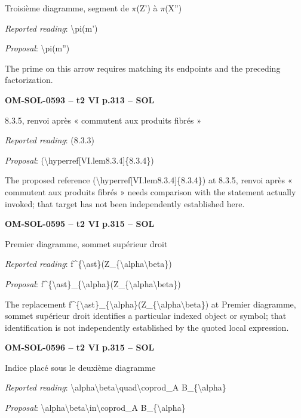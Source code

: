 Troisième diagramme, segment de \ensuremath{\pi}(Z') à \ensuremath{\pi}(X'')\par
\emph{Reported reading}: \textbackslash{}pi(m')\par
\emph{Proposal}: \textbackslash{}pi(m'')\par
The prime on this arrow requires matching its endpoints and the preceding factorization.\par
\par\noindent\textbf{OM-SOL-0593 -- t2 VI p.313 -- SOL}\par
8.3.5, renvoi après « commutent aux produits fibrés »\par
\emph{Reported reading}: (8.3.3)\par
\emph{Proposal}: (\textbackslash{}hyperref[VI.lem8.3.4]\{8.3.4\})\par
The proposed reference (\textbackslash{}hyperref[VI.lem8.3.4]\{8.3.4\}) at 8.3.5, renvoi après « commutent aux produits fibrés » needs comparison with the statement actually invoked; that target has not been independently established here.\par
\par\noindent\textbf{OM-SOL-0595 -- t2 VI p.315 -- SOL}\par
Premier diagramme, sommet supérieur droit\par
\emph{Reported reading}: f\textasciicircum{}\{\textbackslash{}ast\}(Z\_\{\textbackslash{}alpha\textbackslash{}beta\})\par
\emph{Proposal}: f\textasciicircum{}\{\textbackslash{}ast\}\_\{\textbackslash{}alpha\}(Z\_\{\textbackslash{}alpha\textbackslash{}beta\})\par
The replacement f\textasciicircum{}\{\textbackslash{}ast\}\_\{\textbackslash{}alpha\}(Z\_\{\textbackslash{}alpha\textbackslash{}beta\}) at Premier diagramme, sommet supérieur droit identifies a particular indexed object or symbol; that identification is not independently established by the quoted local expression.\par
\par\noindent\textbf{OM-SOL-0596 -- t2 VI p.315 -- SOL}\par
Indice placé sous le deuxième diagramme\par
\emph{Reported reading}: \textbackslash{}alpha\textbackslash{}beta\textbackslash{}quad\textbackslash{}coprod\_A B\_\{\textbackslash{}alpha\}\par
\emph{Proposal}: \textbackslash{}alpha\textbackslash{}beta\textbackslash{}in\textbackslash{}coprod\_A B\_\{\textbackslash{}alpha\}\par
